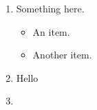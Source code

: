 
\begin{enumerate}

	\item

		Something
		here.

		\begin{itemize}
			\item
				An item.
			\item
				Another item.

		\end{itemize}

	\item
		Hello

	\item
\end{enumerate}
